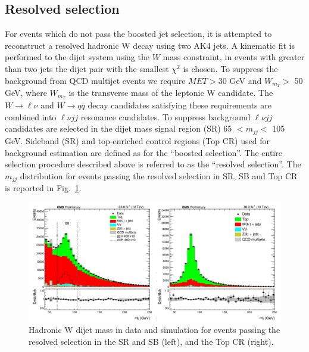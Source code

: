 \subsection*{Resolved selection}
For events which do not pass the boosted jet selection, it is attempted to reconstruct a resolved
hadronic W decay using two AK4 jets.
A kinematic fit is performed to the dijet system using
the $W$ mass constraint, in events with greater than two jets the dijet pair with the smallest $\chi^2$ is
chosen.
To suppress the background from QCD multijet events we require $MET>$30 GeV and
 $W_{m_T} >$ 50 GeV, where $W_{m_T}$ is the transverse mass of the leptonic W candidate. 
The $W \to \ell \nu$ and $W \to q \bar{q}$  decay candidates satisfying these requirements are combined into $\ell \nu jj$ resonance
candidates. To suppress background $\ell \nu jj$ candidates are selected in the dijet mass signal region (SR)
65 $< m_{jj} <$ 105 GeV. Sideband (SR) and top-enriched control regions (Top CR) used for background estimation are
defined as for the ``boosted selection''.
The entire selection procedure described above is referred to as the ``resolved selection''.
The $m_{jj}$ distribution for events passing the resolved selection in SR,  SB and  Top CR is reported in Fig.~\ref{mjj}.
\begin{figure}
\centering
\includegraphics[scale= 0.8]{../Cap5/mjj}
\caption{Hadronic W dijet mass in data and simulation for events passing the resolved selection in the SR and SB (left), and the Top CR (right).}
\label{mjj}
\end{figure}



